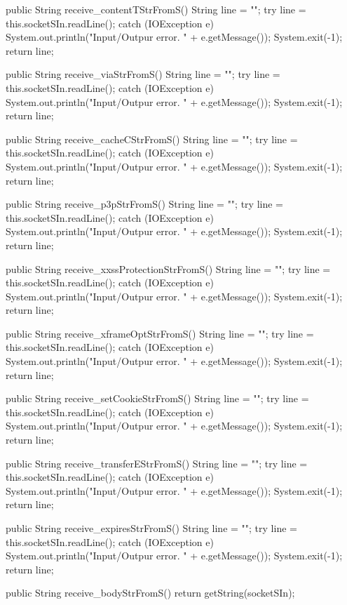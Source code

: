 \begin{code}
{    public String receive_contentTStrFromS() {
        String line = "";
        try {
            line = this.socketSIn.readLine();
        } catch (IOException e) {
            System.out.println("Input/Outpur error. " + e.getMessage());
            System.exit(-1);
        }
        return line;
    }

    public String receive_viaStrFromS() {
        String line = "";
        try {
            line = this.socketSIn.readLine();
        } catch (IOException e) {
            System.out.println("Input/Outpur error. " + e.getMessage());
            System.exit(-1);
        }
        return line;
    }

    public String receive_cacheCStrFromS() {
        String line = "";
        try {
            line = this.socketSIn.readLine();
        } catch (IOException e) {
            System.out.println("Input/Outpur error. " + e.getMessage());
            System.exit(-1);
        }
        return line;
    }

    public String receive_p3pStrFromS() {
        String line = "";
        try {
            line = this.socketSIn.readLine();
        } catch (IOException e) {
            System.out.println("Input/Outpur error. " + e.getMessage());
            System.exit(-1);
        }
        return line;
    }

    public String receive_xxssProtectionStrFromS() {
        String line = "";
        try {
            line = this.socketSIn.readLine();
        } catch (IOException e) {
            System.out.println("Input/Outpur error. " + e.getMessage());
            System.exit(-1);
        }
        return line;
    }

    public String receive_xframeOptStrFromS() {
        String line = "";
        try {
            line = this.socketSIn.readLine();
        } catch (IOException e) {
            System.out.println("Input/Outpur error. " + e.getMessage());
            System.exit(-1);
        }
        return line;
    }

    public String receive_setCookieStrFromS() {
        String line = "";
        try {
            line = this.socketSIn.readLine();
        } catch (IOException e) {
            System.out.println("Input/Outpur error. " + e.getMessage());
            System.exit(-1);
        }
        return line;
    }

    public String receive_transferEStrFromS() {
        String line = "";
        try {
            line = this.socketSIn.readLine();
        } catch (IOException e) {
            System.out.println("Input/Outpur error. " + e.getMessage());
            System.exit(-1);
        }
        return line;
    }

    public String receive_expiresStrFromS() {
        String line = "";
        try {
            line = this.socketSIn.readLine();
        } catch (IOException e) {
            System.out.println("Input/Outpur error. " + e.getMessage());
            System.exit(-1);
        }
        return line;
    }

    public String receive_bodyStrFromS() {
        return getString(socketSIn);
    }

}\end{code}

